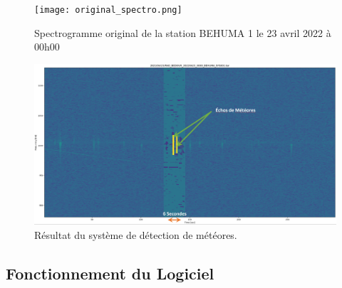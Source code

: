 \documentclass[11pt]{article}
\begin{document}
\begin{figure}[htp]
    \begin{center}
        \texttt{[image: original\_spectro.png]}
        \caption{Spectrogramme original de la station BEHUMA 1 le 23 avril 2022 à 00h00}
        \label{fig:spectro-orig}
    \end{center}
\end{figure}

\begin{figure}[hbp]
    \begin{center}
        \includegraphics[scale=0.275]{Screenshot 2022-08-14 233814.png}
        \caption{Résultat du système de détection de météores.}
        \label{fig:meteor-detect-ex}
    \end{center}
\end{figure}

\subsection{Fonctionnement du Logiciel}
\end{document}
